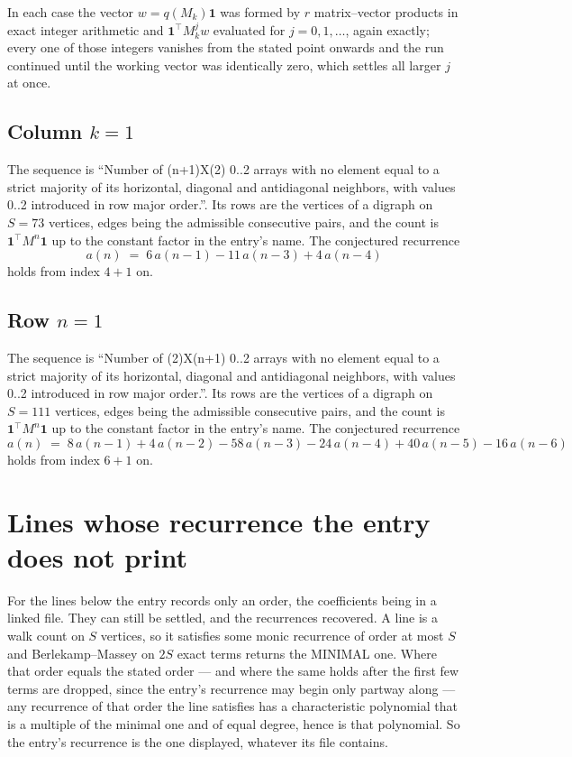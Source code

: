 \documentclass[11pt,a4paper]{article}
\theoremstyle{plain}
\theoremstyle{definition}
\begin{document}
In each case the vector $w=q(M_k)\mathbf{1}$ was formed by $r$ matrix--vector products in
exact integer arithmetic and $\mathbf{1}^{\!\top}M_k^{j}w$ evaluated for $j=0,1,\dots$,
again exactly; every one of those integers vanishes from the stated point onwards and the run
continued until the working vector was identically zero, which settles all larger $j$ at once.

\subsection*{Column $k$$=1$}
The sequence is ``Number of (n+1)X(2) 0..2 arrays with no element equal to a strict majority of its horizontal, diagonal and antidiagonal neighbors, with values 0..2 introduced in row major order.''. Its rows are the vertices of a digraph on
$S=73$ vertices, edges being the admissible consecutive pairs, and the count is
$\mathbf{1}^{\!\top}M^{n}\mathbf{1}$ up to the constant factor in the entry's name.
The conjectured recurrence
\[
a(n)\;=\;6\,a(n-1) - 11\,a(n-3) + 4\,a(n-4)
\]
holds from index $4+1$ on.

\subsection*{Row $n$$=1$}
The sequence is ``Number of (2)X(n+1) 0..2 arrays with no element equal to a strict majority of its horizontal, diagonal and antidiagonal neighbors, with values 0..2 introduced in row major order.''. Its rows are the vertices of a digraph on
$S=111$ vertices, edges being the admissible consecutive pairs, and the count is
$\mathbf{1}^{\!\top}M^{n}\mathbf{1}$ up to the constant factor in the entry's name.
The conjectured recurrence
\[
a(n)\;=\;8\,a(n-1) + 4\,a(n-2) - 58\,a(n-3) - 24\,a(n-4) + 40\,a(n-5) - 16\,a(n-6)
\]
holds from index $6+1$ on.


\section{Lines whose recurrence the entry does not print}

For the lines below the entry records only an order, the coefficients being in a linked file.
They can still be settled, and the recurrences recovered. A line is a walk count on $S$
vertices, so it satisfies some monic recurrence of order at most $S$ and Berlekamp--Massey on
$2S$ exact terms returns the MINIMAL one. Where that order equals the stated order --- and
where the same holds after the first few terms are dropped, since the entry's recurrence may
begin only partway along --- any recurrence of that order the line satisfies has a
characteristic polynomial that is a multiple of the minimal one and of equal degree, hence is
that polynomial. So the entry's recurrence is the one displayed, whatever its file contains.
\end{document}
